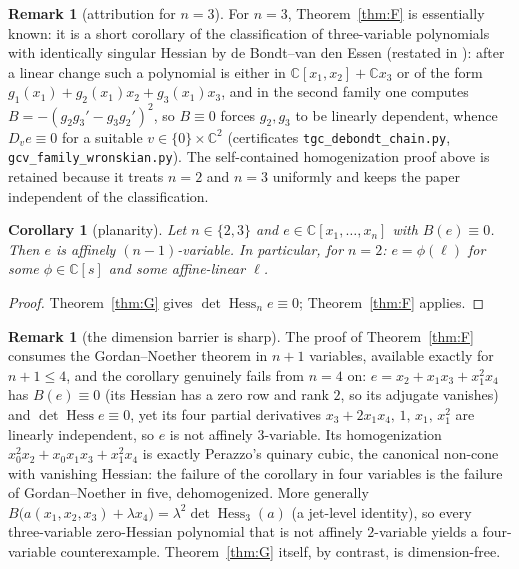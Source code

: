 \documentclass[11pt]{article}
\theoremstyle{plain}
\newtheorem{corollary}[theorem]{Corollary}
\theoremstyle{definition}
\newtheorem{remark}[theorem]{Remark}
\newcommand{\C}{\mathbb{C}}
\newcommand{\Hess}{\operatorname{Hess}}
\begin{document}
\begin{remark}[attribution for $n=3$]\label{rem:Fknown}
For $n=3$, Theorem~\ref{thm:F} is essentially known: it is a short
corollary of the classification of three-variable polynomials with
identically singular Hessian by de Bondt--van den Essen
\cite[Thm.~3.3]{dBvdE} (restated in \cite{deBondt2015}): after a linear
change such a polynomial is either in $\C[x_1,x_2]+\C x_3$ or of the form
$g_1(x_1)+g_2(x_1)x_2+g_3(x_1)x_3$, and in the second family one computes
$B=-(g_2g_3'-g_3g_2')^2$, so $B\equiv0$ forces $g_2,g_3$ to be linearly
dependent, whence $D_ve\equiv0$ for a suitable $v\in\{0\}\times\C^2$
(certificates \texttt{tgc\_debondt\_chain.py},
\texttt{gcv\_family\_wronskian.py}). The self-contained homogenization
proof above is retained because it treats $n=2$ and $n=3$ uniformly and
keeps the paper independent of the classification.
\end{remark}

\begin{corollary}[planarity]\label{cor:planar}
Let $n\in\{2,3\}$ and $e\in\C[x_1,\dots,x_n]$ with $B(e)\equiv0$. Then
$e$ is affinely $(n-1)$-variable. In particular, for $n=2$: $e=\phi(\ell)$
for some $\phi\in\C[s]$ and some affine-linear $\ell$.
\end{corollary}

\begin{proof}
Theorem~\ref{thm:G} gives $\det\Hess_ne\equiv0$; Theorem~\ref{thm:F}
applies.
\end{proof}

\begin{remark}[the dimension barrier is sharp]\label{rem:dim}
The proof of Theorem~\ref{thm:F} consumes the Gordan--Noether theorem in
$n+1$ variables, available exactly for $n+1\le4$, and the corollary
genuinely fails from $n=4$ on: $e=x_2+x_1x_3+x_1^2x_4$ has $B(e)\equiv0$
(its Hessian has a zero row and rank $2$, so its adjugate vanishes) and
$\det\Hess e\equiv0$, yet its four partial derivatives
$x_3+2x_1x_4,\,1,\,x_1,\,x_1^2$ are linearly independent, so $e$ is not
affinely $3$-variable. Its homogenization $x_0^2x_2+x_0x_1x_3+x_1^2x_4$ is
exactly Perazzo's quinary cubic, the canonical non-cone with vanishing
Hessian: the failure of the corollary in four variables is the failure
of Gordan--Noether in five, dehomogenized. More generally
$B\bigl(a(x_1,x_2,x_3)+\lambda x_4\bigr)=\lambda^2\det\Hess_3(a)$ (a
jet-level identity), so every three-variable zero-Hessian polynomial that
is not affinely $2$-variable yields a four-variable counterexample.
Theorem~\ref{thm:G} itself, by contrast, is dimension-free.
\end{remark}
\end{document}
